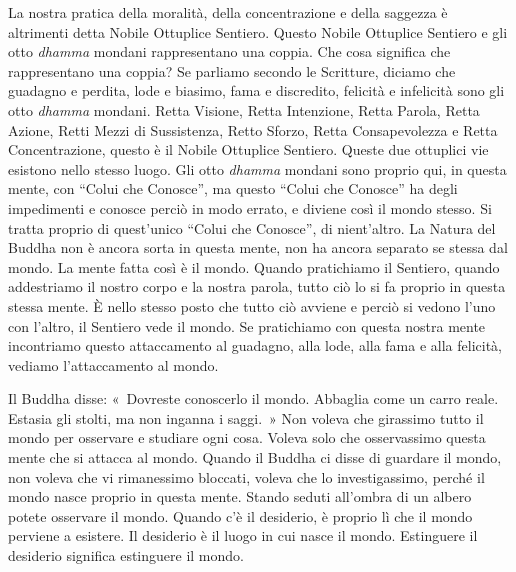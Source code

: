 La nostra pratica della moralità, della concentrazione e della saggezza
è altrimenti detta Nobile Ottuplice Sentiero. Questo Nobile Ottuplice
Sentiero e gli otto \emph{dhamma} mondani rappresentano una coppia. Che
cosa significa che rappresentano una coppia? Se parliamo secondo le
Scritture, diciamo che guadagno e perdita, lode e biasimo, fama e
discredito, felicità e infelicità sono gli otto \emph{dhamma} mondani.
Retta Visione, Retta Intenzione, Retta Parola, Retta Azione, Retti Mezzi
di Sussistenza, Retto Sforzo, Retta Consapevolezza e Retta
Concentrazione, questo è il Nobile Ottuplice Sentiero. Queste due
ottuplici vie esistono nello stesso luogo. Gli otto \emph{dhamma}
mondani sono proprio qui, in questa mente, con ``Colui che Conosce'', ma
questo ``Colui che Conosce'' ha degli impedimenti e conosce perciò in
modo errato, e diviene così il mondo stesso. Si tratta proprio di
quest'unico ``Colui che Conosce'', di nient'altro. La Natura del Buddha
non è ancora sorta in questa mente, non ha ancora separato se stessa dal
mondo. La mente fatta così è il mondo. Quando pratichiamo il Sentiero,
quando addestriamo il nostro corpo e la nostra parola, tutto ciò lo si
fa proprio in questa stessa mente. È nello stesso posto che tutto ciò
avviene e perciò si vedono l'uno con l'altro, il Sentiero vede il mondo.
Se pratichiamo con questa nostra mente incontriamo questo attaccamento
al guadagno, alla lode, alla fama e alla felicità, vediamo
l'attaccamento al mondo.

Il Buddha disse: «~Dovreste conoscerlo il mondo. Abbaglia come un carro
reale. Estasia gli stolti, ma non inganna i saggi.~» Non voleva che
girassimo tutto il mondo per osservare e studiare ogni cosa. Voleva solo
che osservassimo questa mente che si attacca al mondo. Quando il Buddha
ci disse di guardare il mondo, non voleva che vi rimanessimo bloccati,
voleva che lo investigassimo, perché il mondo nasce proprio in questa
mente. Stando seduti all'ombra di un albero potete osservare il mondo.
Quando c'è il desiderio, è proprio lì che il mondo perviene a esistere.
Il desiderio è il luogo in cui nasce il mondo. Estinguere il desiderio
significa estinguere il mondo.

